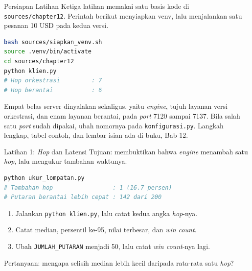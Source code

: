 \documentclass[aspectratio=169, table, 12pt]{beamer}
\begin{document}
\begin{frame}[fragile]{{\Large Persiapan Latihan}}
  \vspace{4pt}
  {\small Ketiga latihan memakai satu basis kode di
  \texttt{sources/chapter12}. Perintah berikut menyiapkan venv, lalu
  menjalankan satu pesanan 10 USD pada kedua versi.}
  \vspace{2pt}
\begin{lstlisting}[language=bash]
bash sources/siapkan_venv.sh
source .venv/bin/activate
cd sources/chapter12
python klien.py
# Hop orkestrasi         : 7
# Hop berantai           : 6
\end{lstlisting}

  \vspace{4pt}
  {\small Empat belas server dinyalakan sekaligus, yaitu \textit{engine}, tujuh
  layanan versi orkestrasi, dan enam layanan berantai, pada \textit{port} 7120
  sampai 7137. Bila salah satu \textit{port} sudah dipakai, ubah nomornya pada
  \texttt{konfigurasi.py}. Langkah lengkap, tabel contoh, dan lembar isian ada
  di buku, Bab 12.}
\end{frame}

\begin{frame}[fragile]{{\Large Latihan 1: \textit{Hop} dan Latensi}}
  \vspace{8pt}
  {\small Tujuan: membuktikan bahwa \textit{engine} menambah satu \textit{hop},
  lalu mengukur tambahan waktunya.}
  \vspace{2pt}
\begin{lstlisting}[language=bash]
python ukur_lompatan.py
# Tambahan hop                 : 1 (16.7 persen)
# Putaran berantai lebih cepat : 142 dari 200
\end{lstlisting}
  \begin{enumerate}\small
    \item Jalankan \texttt{python klien.py}, lalu catat kedua angka
          \textit{hop}-nya.
    \item Catat median, persentil ke-95, nilai terbesar, dan \textit{win count}.
    \item Ubah \texttt{JUMLAH\_PUTARAN} menjadi 50, lalu catat \textit{win
          count}-nya lagi.
  \end{enumerate}
  {\small Pertanyaan: mengapa selisih median lebih kecil daripada rata-rata
  satu \textit{hop}?}
\end{frame}
\end{document}
